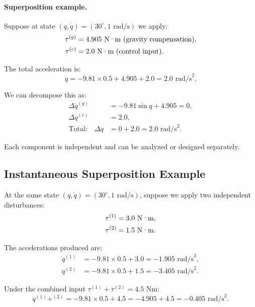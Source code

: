 \paragraph{Superposition example.}
Suppose at state $(q, \dot q) = (30^\circ, 1 \text{ rad/s})$ we apply:
\begin{align}
\tau^{(g)} &= 4.905 \text{ N\textperiodcentered{}m (gravity compensation)}, \\
\tau^{(c)} &= 2.0 \text{ N\textperiodcentered{}m (control input)}.
\end{align}

The total acceleration is:
\begin{equation}
\ddot q = -9.81 \times 0.5 + 4.905 + 2.0 = 2.0 \text{ rad/s}^2.
\end{equation}

We can decompose this as:
\begin{align}
\Delta\ddot q^{(g)} &= -9.81\sin q + 4.905 = 0, \\
\Delta\ddot q^{(c)} &= 2.0, \\
\text{Total:} \quad \Delta\ddot q &= 0 + 2.0 = 2.0 \text{ rad/s}^2.
\end{align}

Each component is independent and can be analyzed or designed separately.

\subsection{Instantaneous Superposition Example}

At the same state $(q, \dot q) = (30^\circ, 1 \text{ rad/s})$, suppose we apply two independent
disturbances:
\begin{align}
\tau^{(1)} &= 3.0 \text{ N\textperiodcentered{}m}, \\
\tau^{(2)} &= 1.5 \text{ N\textperiodcentered{}m}.
\end{align}

The accelerations produced are:
\begin{align}
\ddot q^{(1)} &= -9.81 \times 0.5 + 3.0 = -1.905 \text{ rad/s}^2, \\
\ddot q^{(2)} &= -9.81 \times 0.5 + 1.5 = -3.405 \text{ rad/s}^2.
\end{align}

Under the combined input $\tau^{(1)} + \tau^{(2)} = 4.5$ N\textperiodcentered{}m:
\begin{equation}
\ddot q^{(1)}+^{(2)} = -9.81 \times 0.5 + 4.5 = -4.905 + 4.5 = -0.405 \text{ rad/s}^2.
\end{equation}


